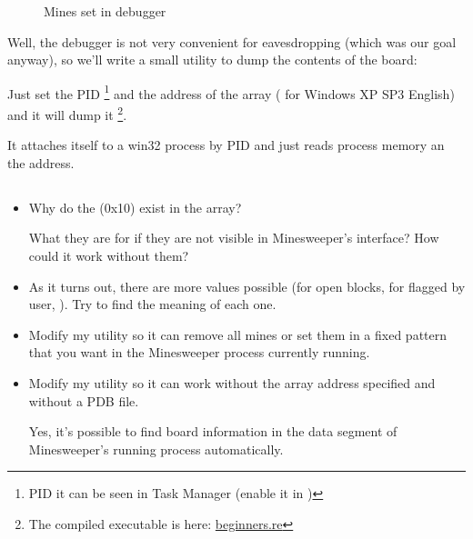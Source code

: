 \begin{figure}[H]
\centering
{}
\caption{Mines set in debugger}
\label{fig:minesweeper2}
\end{figure}

Well, the debugger is not very convenient for eavesdropping (which was our goal anyway), so we'll write a small utility
to dump the contents of the board:



Just set the \ac{PID}
\footnote{PID it can be seen in Task Manager 
(enable it in )} 
and the address of the array ( for Windows XP SP3 English) 
and it will dump it
\footnote{The compiled executable is here: 
\href{http://go.yurichev.com/17165}{beginners.re}}.

It attaches itself to a win32 process by \ac{PID} and just reads process memory an the address.

\subsection{\Exercises}

\begin{itemize}

\item 
Why do the  (0x10) exist in the array?

What they are for if they are not visible in Minesweeper's interface?
How could it work without them?

\item 
As it turns out, there are more values possible (for open blocks, for flagged by user, \etc{}).
Try to find the meaning of each one.

\item 
Modify my utility so it can remove all mines or set them in a fixed pattern that you want in the Minesweeper
process currently running.

\item 
Modify my utility so it can work without the array address specified and without a \gls{PDB} file.

Yes, it's possible to find board information in the data segment of Minesweeper's running process automatically.

\end{itemize}
